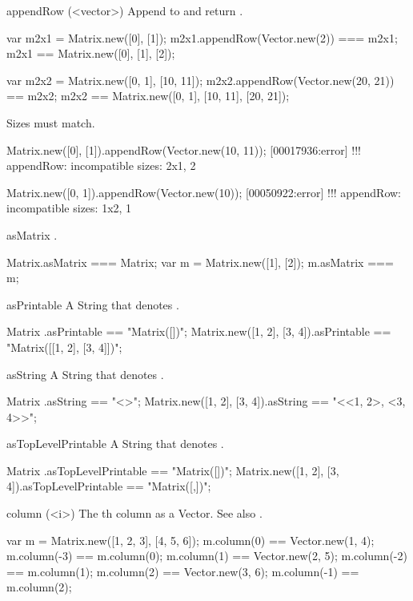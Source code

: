 \begin{urbiscriptapi}
\item[appendRow](<vector>)%
  Append  to \this and return \this.
\begin{urbiassert}
var m2x1 = Matrix.new([0], [1]);
m2x1.appendRow(Vector.new(2)) === m2x1;
m2x1 == Matrix.new([0], [1], [2]);

var m2x2 = Matrix.new([0, 1], [10, 11]);
m2x2.appendRow(Vector.new(20, 21)) == m2x2;
m2x2 == Matrix.new([0, 1], [10, 11], [20, 21]);
\end{urbiassert}

  Sizes must match.
\begin{urbiscript}
Matrix.new([0], [1]).appendRow(Vector.new(10, 11));
[00017936:error] !!! appendRow: incompatible sizes: 2x1, 2

Matrix.new([0, 1]).appendRow(Vector.new(10));
[00050922:error] !!! appendRow: incompatible sizes: 1x2, 1
\end{urbiscript}


\item[asMatrix]%
  \this.
\begin{urbiassert}
Matrix.asMatrix === Matrix;
var m = Matrix.new([1], [2]);
m.asMatrix === m;
\end{urbiassert}


\item[asPrintable]%
  A String that denotes \this.
\begin{urbiassert}
Matrix                    .asPrintable == "Matrix([])";
Matrix.new([1, 2], [3, 4]).asPrintable == "Matrix([[1, 2], [3, 4]])";
\end{urbiassert}


\item[asString]%
  A String that denotes \this.
\begin{urbiassert}
Matrix                    .asString == "<>";
Matrix.new([1, 2], [3, 4]).asString == "<<1, 2>, <3, 4>>";
\end{urbiassert}


\item[asTopLevelPrintable]%
  A String that denotes \this.
\begin{urbiassert}
Matrix                    .asTopLevelPrintable
  == "Matrix([])";
Matrix.new([1, 2], [3, 4]).asTopLevelPrintable
 == "Matrix([\n  [1, 2],\n  [3, 4]])";
\end{urbiassert}


\item[column](<i>)%
  The th column as a Vector.  See also .
\begin{urbiassert}
var m = Matrix.new([1, 2, 3], [4, 5, 6]);
m.column(0) == Vector.new(1, 4);  m.column(-3) == m.column(0);
m.column(1) == Vector.new(2, 5);  m.column(-2) == m.column(1);
m.column(2) == Vector.new(3, 6);  m.column(-1) == m.column(2);


\end{urbiassert}
\end{urbiscriptapi}
